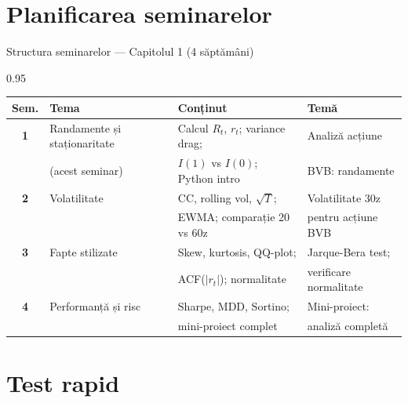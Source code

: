 \documentclass[9pt, aspectratio=169, t]{beamer}
\begin{document}
\section{Planificarea seminarelor}

\begin{frame}{Structura seminarelor --- Capitolul 1 (4 săptămâni)}
    \begin{cminipage}{0.95\textwidth}
    \begin{center}
    {\small
    \renewcommand{\arraystretch}{1.4}
    \begin{tabular}{>{\bfseries}clll}
    \toprule
    \textbf{Sem.} & \textbf{Tema} & \textbf{Conținut} & \textbf{Temă} \\
    \midrule
    1 & Randamente și staționaritate & Calcul $R_t$, $r_t$; variance drag; & Analiză acțiune \\
      & (acest seminar) & $I(1)$ vs $I(0)$; Python intro & BVB: randamente \\
    \midrule
    2 & Volatilitate & CC, rolling vol, $\sqrt{T}$; & Volatilitate 30z \\
      & & EWMA; comparație 20 vs 60z & pentru acțiune BVB \\
    \midrule
    3 & Fapte stilizate & Skew, kurtosis, QQ-plot; & Jarque-Bera test; \\
      & & ACF($|r_t|$); normalitate & verificare normalitate \\
    \midrule
    4 & Performanță și risc & Sharpe, MDD, Sortino; & Mini-proiect: \\
      & & mini-proiect complet & analiză completă \\
    \bottomrule
    \end{tabular}
    }
    \end{center}
    \end{cminipage}
\end{frame}


\section{Test rapid}
\end{document}
